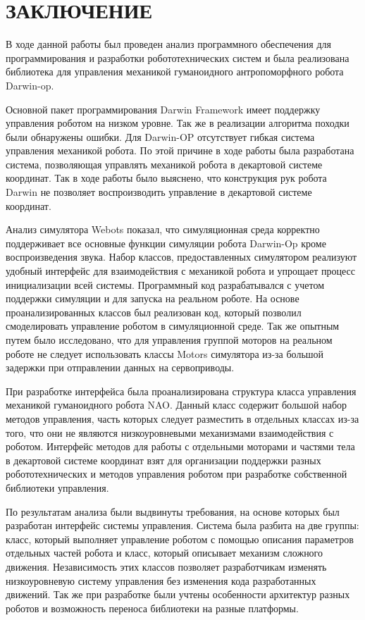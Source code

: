 \chapter*{ЗАКЛЮЧЕНИЕ}

В ходе данной работы был проведен анализ программного обеспечения для программирования и разработки робототехнических систем и была реализована библиотека для управления механикой гуманоидного антропоморфного робота Darwin-op.

Основной пакет программирования Darwin Framework имеет поддержку управления роботом на низком уровне. Так же в реализации алгоритма походки были обнаружены ошибки. Для Darwin-OP отсутствует гибкая система управления механикой робота. По этой причине в ходе работы была разработана система, позволяющая управлять механикой робота в декартовой системе координат. Так в ходе работы было выяснено, что конструкция рук робота Darwin не позволяет воспроизводить управление в декартовой системе координат.

Анализ симулятора Webots показал, что симуляционная среда корректно поддерживает все основные функции симуляции робота Darwin-Op кроме воспроизведения звука. Набор классов, предоставленных симулятором реализуют удобный интерфейс для взаимодействия с механикой робота и упрощает процесс инициализации всей системы. Программный код разрабатывался с учетом поддержки симуляции и для запуска на реальном роботе. На основе проанализированных классов был реализован код, который позволил смоделировать управление роботом в симуляционной среде. Так же опытным путем было исследовано, что для управления группой моторов на реальном роботе не следует использовать классы Motors симулятора из-за большой задержки при отправлении данных на сервоприводы.

При разработке интерфейса была проанализирована структура класса управления механикой гуманоидного робота NAO. Данный класс содержит большой набор методов управления, часть которых следует разместить в отдельных классах из-за того, что они не являются низкоуровневыми механизмами взаимодействия с роботом. Интерфейс методов для работы с отдельными моторами и частями тела в декартовой системе координат взят для организации поддержки разных робототехнических и методов управления роботом при разработке собственной библиотеки управления.

По результатам анализа были выдвинуты требования, на основе которых был разработан интерфейс системы управления. Система была разбита на две группы: класс, который выполняет управление роботом с помощью описания параметров отдельных частей робота и класс, который описывает механизм сложного движения. Независимость этих классов позволяет разработчикам изменять низкоуровневую систему управления без изменения кода разработанных движений. Так же при разработке были учтены особенности архитектур разных роботов и возможность переноса библиотеки на разные платформы. 

